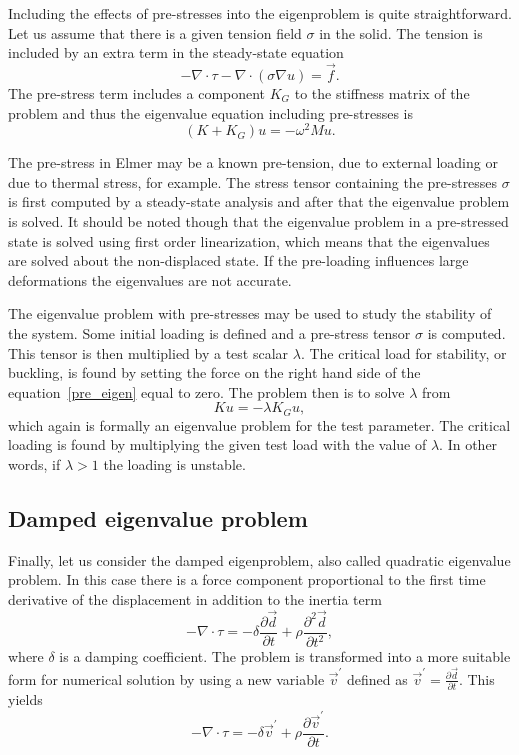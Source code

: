 \begin{versiona}
Including the effects of pre-stresses into the eigenproblem is quite
straightforward. Let us assume that there is a given tension field
$\sigma$ in the solid. The tension is included by an extra term in the
steady-state equation
\begin{equation}
\label{pre_eigen}
-\nabla\cdot\tau -\nabla\cdot(\sigma\nabla u) = \vec{f}.
\end{equation}
The pre-stress term includes a component $K_G$ to the stiffness matrix
of the problem and thus the eigenvalue equation including pre-stresses
is
\begin{equation}
(K+K_G)u = -\omega^2Mu.
\end{equation} 

The pre-stress in Elmer may be a known pre-tension, due to external
loading or due to thermal stress, for example. The stress tensor
containing the pre-stresses $\sigma$ is first computed by a
steady-state analysis and after that the eigenvalue problem is
solved. It should be noted though that the eigenvalue problem in a
pre-stressed state is solved using first order linearization, which
means that the eigenvalues are solved about the non-displaced
state. If the pre-loading influences large deformations the
eigenvalues are not accurate.

The eigenvalue problem with pre-stresses may be used to study the
stability of the system. Some initial loading is defined and a
pre-stress tensor $\sigma$ is computed. This tensor is then multiplied
by a test scalar $\lambda$. The critical load for stability, or
buckling, is found by setting the force on the right hand side of the
equation~\ref{pre_eigen} equal to zero. The problem then is to solve
$\lambda$ from
\begin{equation}
Ku = -\lambda K_G u,
\end{equation}
which again is formally an eigenvalue problem for the test
parameter. The critical loading is found by multiplying the given test
load with the value of $\lambda$. In other words, if $\lambda > 1$ the
loading is unstable.

\subsection{Damped eigenvalue problem}

Finally, let us consider the damped eigenproblem, also called
quadratic eigenvalue problem. In this case there is a force component
proportional to the first time derivative of the displacement in
addition to the inertia term
\begin{equation}
-\nabla\cdot\tau = -\delta\frac{\partial \vec{d}}{\partial t} +
 \rho\frac{\partial^2 \vec{d}}{\partial t^2},
\end{equation}
where $\delta$ is a damping coefficient. The problem is transformed
into a more suitable form for numerical solution by using a new
variable $\vec{v}^{\prime}$ defined as
$\vec{v}^{\prime}=\frac{\partial \vec{d}}{\partial t}$. This yields
\begin{equation}
-\nabla\cdot\tau = -\delta\vec{v}^{\prime} +
\rho\frac{\partial \vec{v}^{\prime}}{\partial t}.
\end{equation}


\end{versiona}
